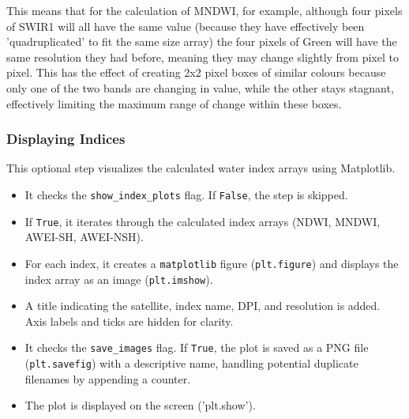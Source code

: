 This means that for the calculation of MNDWI, for example, although four pixels of SWIR1 will all have the same value (because they have effectively been 'quadruplicated' to fit the same size array) the four pixels of Green will have the same resolution they had before, meaning they may change slightly from pixel to pixel. This has the effect of creating 2x2 pixel boxes of similar colours because only one of the two bands are changing in value, while the other stays stagnant, effectively limiting the maximum range of change within these boxes. 

\subsubsection{Displaying Indices}
This optional step visualizes the calculated water index arrays using Matplotlib.
\begin{itemize}
    \item It checks the \verb|show_index_plots| flag. If \verb|False|, the step is skipped.
    \item If \verb|True|, it iterates through the calculated index arrays (NDWI, MNDWI, AWEI-SH, AWEI-NSH).
    \item For each index, it creates a \verb|matplotlib| figure (\verb|plt.figure|) and displays the index array as an image (\verb|plt.imshow|).
    \item A title indicating the satellite, index name, DPI, and resolution is added. Axis labels and ticks are hidden for clarity.
    \item It checks the \verb|save_images| flag. If \verb|True|, the plot is saved as a PNG file (\verb|plt.savefig|) with a descriptive name, handling potential duplicate filenames by appending a counter.
    \item The plot is displayed on the screen ('plt.show').
\end{itemize}

